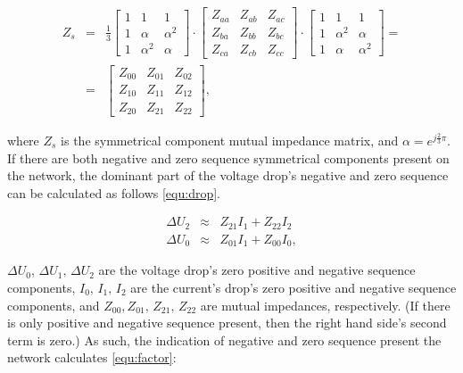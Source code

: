            \begin{equation}
                \begin{array}{rcl}
                       Z_s&=&\frac{1}{3}\begin{bmatrix} 1&1&1\\1&\alpha&\alpha^2\\1&\alpha^2&\alpha \end{bmatrix}\cdot
                                        \begin{bmatrix} Z_{aa}&Z_{ab}&Z_{ac}\\Z_{ba}&Z_{bb}&Z_{bc}\\Z_{ca}&Z_{cb}&Z_{cc} \end{bmatrix}\cdot
                                        \begin{bmatrix} 1&1&1\\1&\alpha^2&\alpha\\1&\alpha&\alpha^2\end{bmatrix}=\\
                          &=&  \begin{bmatrix} Z_{00}&Z_{01}&Z_{02}\\Z_{10}&Z_{11}&Z_{12}\\Z_{20}&Z_{21}&Z_{22} \end{bmatrix},

                \end{array}
                \label{equ:mutual}
            \end{equation}

where $Z_s$ is the symmetrical component mutual impedance matrix, and $\alpha=e^{j\frac{2}{3}\pi}$. If there are both negative and zero sequence symmetrical components present on the network, the dominant part of the voltage drop's negative and zero sequence can be calculated as follows \ref{equ:drop}.

            \begin{equation}
                \begin{array}{rcl}
                       \Delta U_2&\approx&Z_{21}I_1+Z_{22}I_2\\
                       \Delta U_0&\approx&Z_{01}I_1+Z_{00}I_0,
                \end{array}
                \label{equ:drop}
            \end{equation}

$\Delta U_0,\,\Delta U_1,\,\Delta U_2$ are the voltage drop's zero positive and negative sequence components, $I_0,\,I_1,\,I_2$ are the current's drop's zero positive and negative sequence components, and $Z_{00},Z_{01},\,Z_{21},\,Z_{22}$ are mutual impedances,  respectively. (If there is only positive and negative sequence present, then the right hand side's second term is zero.) As such, the indication of negative and zero sequence present the network calculates \ref{equ:factor}:

